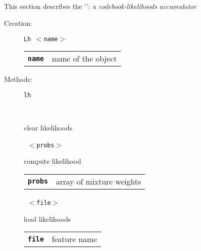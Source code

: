 
\subsection{}

This section describes the '': \textsl{a codebook-likelihoods accumulator}

\begin{description}

  \item[Creation:] \texttt{Lh  $<$name$>$}


      \begin{tabular}{ll}
 \texttt{\textbf{name}} &    name of the object \\
      \end{tabular}

\vspace{3mm} \item[Methods:] \texttt{lh}

    \begin{description}
       \texttt{} \

        clear likelihoods

       \texttt{ $<$probs$>$} \

        compute likelihood

      \begin{tabular}{ll}
 \texttt{\textbf{probs}} &  array of mixture weights \\
      \end{tabular}
       \texttt{ $<$file$>$} \

        load likelihoods

      \begin{tabular}{ll}
 \texttt{\textbf{file}} &  feature name  \\
      \end{tabular}
    \end{description}

\end{description}

